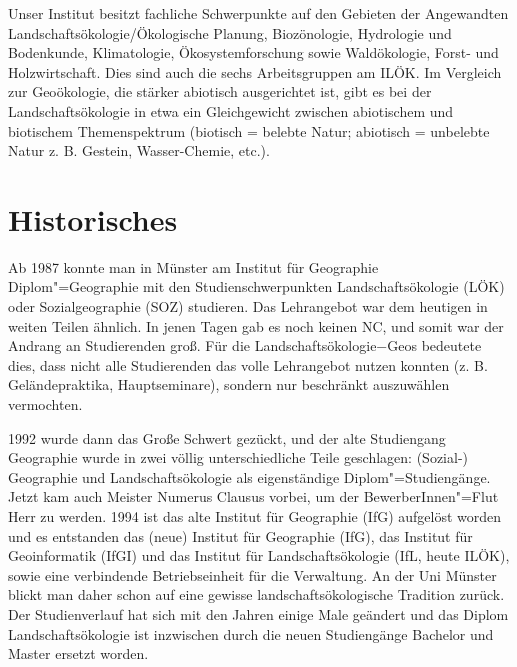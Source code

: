 Unser Institut besitzt fachliche Schwerpunkte auf den Gebieten der Angewandten Landschaftsökologie/Ökologische Planung, Biozönologie, Hydrologie und Bodenkunde, Klimatologie, Ökosystemforschung sowie Waldökologie, Forst- und Holzwirtschaft. Dies sind auch die sechs Arbeitsgruppen am ILÖK. Im Vergleich zur Geoökologie, die stärker abiotisch ausgerichtet ist, gibt es bei der Landschaftsökologie in etwa ein Gleichgewicht zwischen abiotischem und biotischem Themenspektrum (biotisch = belebte Natur; abiotisch = unbelebte Natur z. B. Gestein, Wasser-Chemie, etc.).

\section*{Historisches}
Ab 1987 konnte man in Münster am Institut für Geographie Diplom"=Geographie mit den Studienschwerpunkten Landschaftsökologie (LÖK) oder Sozialgeographie (SOZ) studieren. Das Lehrangebot war dem heutigen in weiten Teilen ähnlich. In jenen Tagen gab es noch keinen NC, und somit war der Andrang an Studierenden groß. Für die Landschaftsökologie−Geos bedeutete dies, dass nicht alle Studierenden das volle Lehrangebot nutzen konnten (z. B. Geländepraktika, Hauptseminare), sondern nur beschränkt auszuwählen vermochten.

1992 wurde dann das Große Schwert gezückt, und der alte Studiengang Geographie wurde in zwei völlig unterschiedliche Teile geschlagen: (Sozial-) Geographie und Landschaftsökologie als eigenständige Diplom"=Studiengänge. Jetzt kam auch Meister Numerus Clausus vorbei, um der BewerberInnen"=Flut Herr zu werden. 1994 ist das alte Institut für Geographie (IfG) aufgelöst worden und es entstanden das (neue) Institut für Geographie (IfG), das Institut für Geoinformatik (IfGI) und das Institut für Landschaftsökologie (IfL, heute ILÖK), sowie eine verbindende Betriebseinheit für die Verwaltung.
An der Uni Münster blickt man daher schon auf eine gewisse landschaftsökologische Tradition zurück. Der Studienverlauf hat sich mit den Jahren einige Male geändert und das Diplom Landschaftsökologie ist inzwischen durch die neuen Studiengänge Bachelor und Master ersetzt worden.

